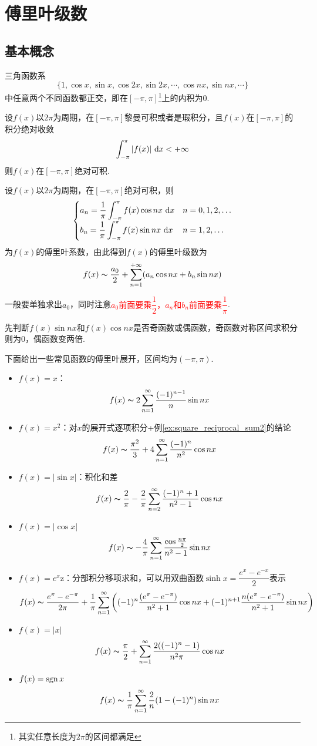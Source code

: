 
\section{傅里叶级数}
\subsection{基本概念}
\begin{theorem}[三角函数系]
三角函数系
\[\{1,\cos x,\sin x,\cos 2x,\sin 2x,\cdots,\cos nx,\sin nx,\cdots\}\]
中任意两个不同函数都正交，即在$[-\pi,\pi]$\footnote{其实任意长度为$2\pi$的区间都满足}上的内积为$0$.
\end{theorem}
\begin{definition}[绝对可积]
设$f(x)$以$2\pi$为周期，在$[-\pi,\pi]$黎曼可积或者是瑕积分，且$f(x)$在$[-\pi,\pi]$的积分绝对收敛
\[\displaystyle\int_{-\pi}^{\pi}{|f(x)|}\,\,\mathrm{d} x<+\infty\]
则$f(x)$在$[-\pi,\pi]$绝对可积.
\end{definition}
\begin{definition}[傅里叶级数]
设$f(x)$以$2\pi$为周期，在$[-\pi,\pi]$绝对可积，则
\[\begin{cases}
a_n=\dfrac{1}{\pi}\displaystyle\int_{-\pi}^{\pi}{f(x)\cos nx}\,\,\mathrm{d} x & n=0,1,2,\ldots\\
b_n=\dfrac{1}{\pi}\displaystyle\int_{-\pi}^{\pi}{f(x)\sin nx}\,\,\mathrm{d} x & n=1,2,\ldots
\end{cases}\]
为$f(x)$的傅里叶系数，由此得到$f(x)$的傅里叶级数为
\[f(x)\thicksim\dfrac{a_0}{2}+\sum_{n=1}^{+\infty}(a_n\cos nx+b_n\sin nx)\]
\end{definition}
\par 一般要单独求出$a_0$，同时注意\textcolor{red}{$a_0$前面要乘$\dfrac{1}{2}$，$a_n$和$b_n$前面要乘$\dfrac{1}{\pi}$}.
\par 先判断$f(x)\sin nx$和$f(x)\cos nx$是否奇函数或偶函数，奇函数对称区间求积分则为$0$，偶函数变两倍.
\par 下面给出一些常见函数的傅里叶展开，区间均为$(-\pi,\pi)$.
\begin{itemize}
	\item $f(x)=x$：
	\[f(x)\thicksim 2\displaystyle\sum_{n=1}^{\infty}\dfrac{(-1)^{n-1}}{n}\sin nx\]
	\item $f(x)=x^2$：对$x$的展开式逐项积分+例\ref{ex:square_reciprocal_sum2}的结论
	\[f(x)\thicksim \dfrac{\pi^2}{3}+4\displaystyle\sum_{n=1}^{\infty}\dfrac{(-1)^{n}}{n^2}\cos nx\]
	\item $f(x)=|\sin x|$：积化和差
	\[f(x)\thicksim \dfrac{2}{\pi}-\dfrac{2}{\pi}\sum_{n=2}^\infty\dfrac{(-1)^n+1}{n^2-1}\cos nx\]
	\item $f(x)=|\cos x|$
	\[f(x)\thicksim -\frac{4}{\pi}\displaystyle\sum_{n=1}^{\infty}\dfrac{\cos\frac{n\pi}{2}}{n^2-1}\sin nx\]
	\item $f(x)=e^x$z：分部积分移项求和，可以用双曲函数$\sinh x=\dfrac{e^x-e^{-x}}{2}$表示
	\[f(x)\thicksim \dfrac{e^\pi-e^{-\pi}}{2\pi}+\dfrac{1}{\pi}\displaystyle\sum_{n=1}^{\infty}\left((-1)^n\dfrac{(e^\pi-e^{-\pi})}{n^2+1}\cos nx+(-1)^{n+1}\dfrac{n(e^\pi-e^{-\pi})}{n^2+1}\sin nx\right)\]
	\item $f(x)=|x|$
	\[f(x)\thicksim \dfrac{\pi}{2}+\displaystyle\sum_{n=1}^{\infty}\dfrac{2((-1)^n-1)}{n^2\pi}\cos nx\]
	\item $f(x)=\mathrm{sgn}\, x$
	\[f(x)\thicksim \dfrac{1}{\pi}\displaystyle\sum_{n=1}^{\infty}\dfrac{2}{n}(1-(-1)^n)\sin nx\]
\end{itemize}

